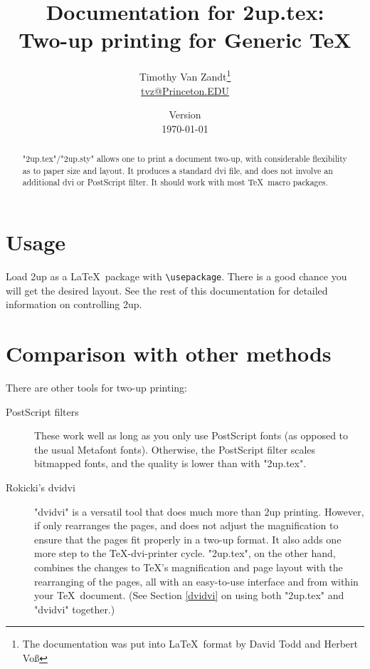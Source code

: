 \documentclass[12pt]{article}
\let\TUfv\fileversion
\begin{document}
\title{Documentation for 2up.tex:\\
  Two-up printing for Generic TeX}
\author{Timothy Van Zandt\thanks{The documentation was put into
  \LaTeX\ format by David Todd and Herbert Vo\ss}\\ \url{tvz@Princeton.EDU}}
\date{Version \TUfv\\[3pt] \today}

\maketitle
\thispagestyle{empty}

\begin{abstract}
  "2up.tex"/"2up.sty" allows one to print a document two-up, with
considerable flexibility as to paper size and layout. It produces a standard
dvi file, and does not involve an additional dvi or PostScript filter. It
should work with most \TeX\ macro packages.

\end{abstract}

\clearpage
\tableofcontents
\clearpage

\section{Usage} 
Load 2up as a \LaTeX\ package with \texttt{\textbackslash usepackage}.
There is a good chance you will get the desired layout. See the rest of
this documentation for detailed information on controlling 2up.

\section{Comparison with other methods}

There are other tools for two-up printing:
\begin{description}
\item[PostScript filters]
These work well as long as you only use PostScript fonts (as opposed to the
usual Metafont fonts). Otherwise, the PostScript filter scales bitmapped
fonts, and the quality is lower than with "2up.tex".

\item[Rokicki's dvidvi]
"dvidvi" is a versatil tool that does much more than
2up printing. However, if only rearranges the pages, and does not adjust the
magnification to ensure that the pages fit properly in a two-up format. It
also adds one more step to the \TeX-dvi-printer cycle. "2up.tex", on the other
hand, combines the changes to \TeX's magnification and page layout with the
rearranging of the pages, all with an easy-to-use interface and from within
your \TeX\ document. (See Section \ref{dvidvi} on using both "2up.tex" and
"dvidvi" together.)
\end{description}
\end{document}
